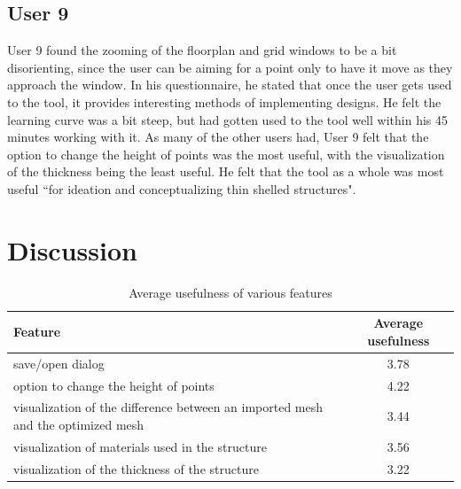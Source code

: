 \documentclass{thesis}
\begin{document}
\subsection{User 9}
User 9 found the zooming of the floorplan and grid windows to be a bit disorienting, since the user can be aiming for a point
only to have it move as they approach the window.  In his questionnaire, he stated that once the user gets used to the tool,
it provides interesting methods of implementing designs.  He felt the learning curve was a bit steep, but had gotten used to
the tool well within his 45 minutes working with it.  As many of the other users had, User 9 felt that the option to change
the height of points was the most useful, with the visualization of the thickness being the least useful.  He felt that the
tool as a whole was most useful ``for ideation and conceptualizing thin shelled structures".


\section{Discussion}
\begin{table}
\begin{center}
  \begin{tabular}{ | p{3in} | c | }
    \hline
    Feature & Average usefulness \\ \hline
	save/open dialog & 3.78 \\ \hline
	option to change the height of points & 4.22 \\ \hline
	visualization of the difference between an imported mesh and the optimized mesh & 3.44 \\ \hline
	visualization of materials used in the structure & 3.56 \\ \hline
    visualization of the thickness of the structure & 3.22 \\ \hline
  \end{tabular}
  \caption{Average usefulness of various features}
  \label{tbl:features}
\end{center}
\end{table}
\end{document}
